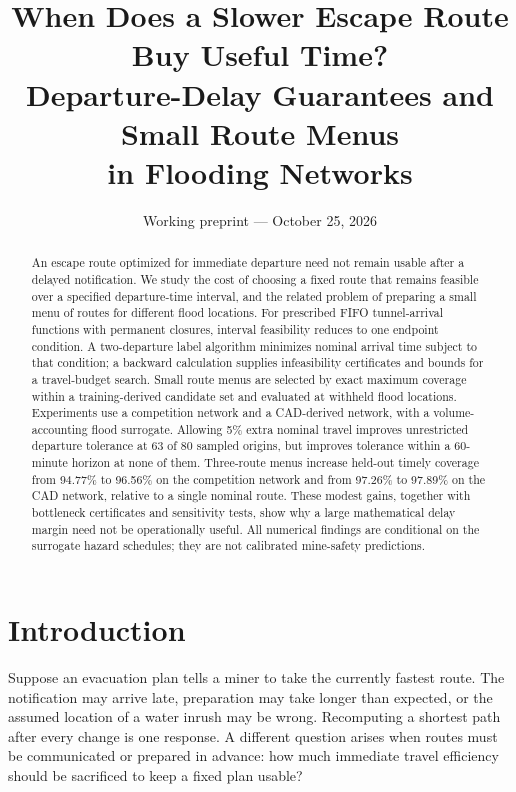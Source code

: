 \documentclass[11pt]{article}
\title{\textbf{When Does a Slower Escape Route Buy Useful Time?}\\[5pt]
\large Departure-Delay Guarantees and Small Route Menus\\in Flooding Networks}
\author{}
\date{Working preprint --- October 25, 2026}
\begin{document}
\maketitle
\begin{abstract}
An escape route optimized for immediate departure need not remain usable after a delayed notification. We study the cost of choosing a fixed route that remains feasible over a specified departure-time interval, and the related problem of preparing a small menu of routes for different flood locations. For prescribed FIFO tunnel-arrival functions with permanent closures, interval feasibility reduces to one endpoint condition. A two-departure label algorithm minimizes nominal arrival time subject to that condition; a backward calculation supplies infeasibility certificates and bounds for a travel-budget search. Small route menus are selected by exact maximum coverage within a training-derived candidate set and evaluated at withheld flood locations. Experiments use a competition network and a CAD-derived network, with a volume-accounting flood surrogate. Allowing 5\% extra nominal travel improves unrestricted departure tolerance at 63 of 80 sampled origins, but improves tolerance within a 60-minute horizon at none of them. Three-route menus increase held-out timely coverage from 94.77\% to 96.56\% on the competition network and from 97.26\% to 97.89\% on the CAD network, relative to a single nominal route. These modest gains, together with bottleneck certificates and sensitivity tests, show why a large mathematical delay margin need not be operationally useful. All numerical findings are conditional on the surrogate hazard schedules; they are not calibrated mine-safety predictions.
\end{abstract}

\section{Introduction}
Suppose an evacuation plan tells a miner to take the currently fastest route. The notification may arrive late, preparation may take longer than expected, or the assumed location of a water inrush may be wrong. Recomputing a shortest path after every change is one response. A different question arises when routes must be communicated or prepared in advance: how much immediate travel efficiency should be sacrificed to keep a fixed plan usable?
\end{document}
